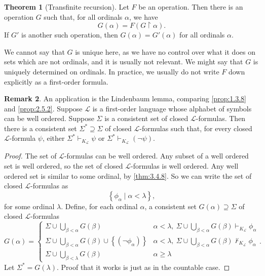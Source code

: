 \documentclass{article}
\renewcommand{\L}{\mathcal{L}}
\newcommand{\rb}[1]{\left( #1 \right)}
\newcommand{\cb}[1]{\left\{ #1 \right\}}
\newcommand{\notb}[1]{\rb{\neg #1}}
\theoremstyle{definition}\newtheorem{definition}{Definition}[subsection]
\theoremstyle{definition}\newtheorem{remark1}[definition]{Remark}
\theoremstyle{definition}\newtheorem{example1}[definition]{Example}
\theoremstyle{definition}\newtheorem*{remark2}{Remark}
\theoremstyle{definition}\newtheorem*{example2}{Example}
\theoremstyle{definition}\newtheorem*{note}{Note}
\theoremstyle{definition}\newtheorem*{notation}{Notation}
\newtheorem{theorem}[definition]{Theorem}
\begin{document}
\begin{theorem}[Transfinite recursion]
\label{thm:3.6.1}
Let $ F $ be an operation. Then there is an operation $ G $ such that, for all ordinals $ \alpha $, we have
$$ G\rb{\alpha} = F\rb{G \upharpoonright \alpha}. $$
If $ G' $ is another such operation, then $ G\rb{\alpha} = G'\rb{\alpha} $ for all ordinals $ \alpha $.
\end{theorem}

We cannot say that $ G $ is unique here, as we have no control over what it does on sets which are not ordinals, and it is usually not relevant. We might say that $ G $ is uniquely determined on ordinals. In practice, we usually do not write $ F $ down explicitly as a first-order formula.

\begin{remark1}
An application is the Lindenbaum lemma, comparing \ref{prop:1.3.8} and \ref{prop:2.5.2}. Suppose $ \L $ is a first-order language whose alphabet of symbols can be well ordered. Suppose $ \Sigma $ is a consistent set of closed $ \L $-formulas. Then there is a consistent set $ \Sigma^* \supseteq \Sigma $ of closed $ \L $-formulas such that, for every closed $ \L $-formula $ \psi $, either $ \Sigma^* \vdash_{K_{\L}} \psi $ or $ \Sigma^* \vdash_{K_{\L}} \notb{\psi} $.
\end{remark1}

\begin{proof}
The set of $ \L $-formulas can be well ordered. Any subset of a well ordered set is well ordered, so the set of closed $ \L $-formulas is well ordered. Any well ordered set is similar to some ordinal, by \ref{thm:3.4.8}. So we can write the set of closed $ \L $-formulas as
$$ \cb{\phi_\alpha \mid \alpha < \lambda}, $$
for some ordinal $ \lambda $. Define, for each ordinal $ \alpha $, a consistent set $ G\rb{\alpha} \supseteq \Sigma $ of closed $ \L $-formulas
$$ G\rb{\alpha} = \begin{cases}
\Sigma \cup \bigcup_{\beta < \alpha} G\rb{\beta} & \alpha < \lambda, \ \Sigma \cup \bigcup_{\beta < \alpha} G\rb{\beta} \vdash_{K_{\L}} \phi_\alpha \\
\Sigma \cup \bigcup_{\beta < \alpha} G\rb{\beta} \cup \cb{\notb{\phi_\alpha}} & \alpha < \lambda, \ \Sigma \cup \bigcup_{\beta < \alpha} G\rb{\beta} \not\vdash_{K_{\L}} \phi_\alpha \\
\Sigma \cup \bigcup_{\beta < \lambda} G\rb{\beta} & \alpha \ge \lambda
\end{cases}. $$
Let $ \Sigma^* = G\rb{\lambda} $. Proof that it works is just as in the countable case.
\end{proof}
\end{document}
